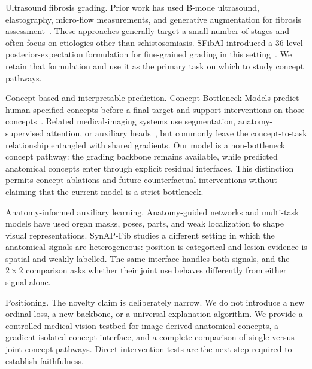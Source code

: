 Ultrasound fibrosis grading. Prior work has used B-mode ultrasound, elastography, micro-flow measurements, and generative augmentation for fibrosis assessment~\cite{microflow2023,swe2018staging,usfibrosisgan2022}. These approaches generally target a small number of stages and often focus on etiologies other than schistosomiasis. SFibAI introduced a 36-level posterior-expectation formulation for fine-grained grading in this setting~\cite{xu2026sfibai}. We retain that formulation and use it as the primary task on which to study concept pathways.

Concept-based and interpretable prediction. Concept Bottleneck Models predict human-specified concepts before a final target and support interventions on those concepts~\cite{koh20a}. Related medical-imaging systems use segmentation, anatomy-supervised attention, or auxiliary heads~\cite{anatomyxnet2022,zhou2020mtlabus}, but commonly leave the concept-to-task relationship entangled with shared gradients. Our model is a non-bottleneck concept pathway: the grading backbone remains available, while predicted anatomical concepts enter through explicit residual interfaces. This distinction permits concept ablations and future counterfactual interventions without claiming that the current model is a strict bottleneck.

Anatomy-informed auxiliary learning. Anatomy-guided networks and multi-task models have used organ masks, poses, parts, and weak localization to shape visual representations. SynAP-Fib studies a different setting in which the anatomical signals are heterogeneous: position is categorical and lesion evidence is spatial and weakly labelled. The same interface handles both signals, and the $2\times2$ comparison asks whether their joint use behaves differently from either signal alone.

Positioning. The novelty claim is deliberately narrow. We do not introduce a new ordinal loss, a new backbone, or a universal explanation algorithm. We provide a controlled medical-vision testbed for image-derived anatomical concepts, a gradient-isolated concept interface, and a complete comparison of single versus joint concept pathways. Direct intervention tests are the next step required to establish faithfulness.


